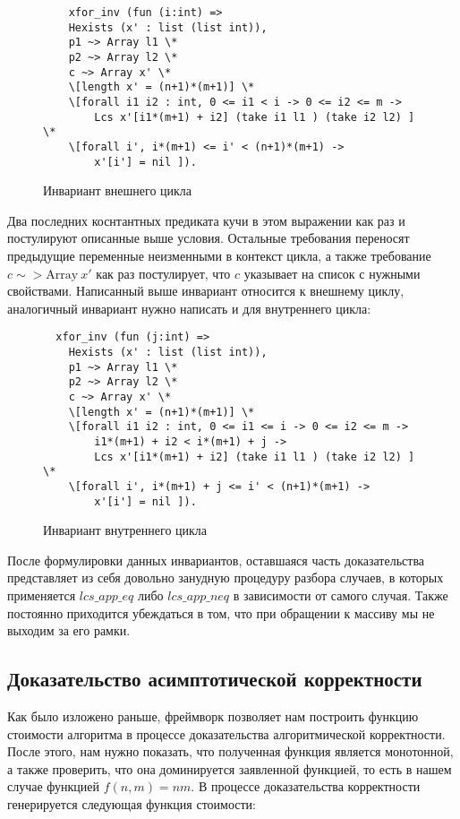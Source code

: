 \begin{figure}[H]
  \caption{Инвариант внешнего цикла}
  \label{code:outer_cycle_inv}
  \begin{verbatim}
    xfor_inv (fun (i:int) => 
    Hexists (x' : list (list int)),
    p1 ~> Array l1 \*
    p2 ~> Array l2 \*
    c ~> Array x' \*
    \[length x' = (n+1)*(m+1)] \*
    \[forall i1 i2 : int, 0 <= i1 < i -> 0 <= i2 <= m -> 
        Lcs x'[i1*(m+1) + i2] (take i1 l1 ) (take i2 l2) ] \* 
    \[forall i', i*(m+1) <= i' < (n+1)*(m+1) ->
        x'[i'] = nil ]). 
  \end{verbatim}
\end{figure}

Два последних коснтантных предиката кучи в этом выражении как раз и постулируют описанные выше условия. Остальные требования переносят
предыдущие переменные неизменными в контекст цикла, а также требование $c \sim> \text{Array}\ x'$  как раз постулирует, что $c$ указывает на
список с нужными свойствами. Написанный выше инвариант относится к внешнему циклу, аналогичный инвариант нужно написать и для внутреннего цикла:

\begin{figure}[H]
  \caption{Инвариант внутреннего цикла}
  \label{code:inner_cycle_inv}
  \begin{verbatim}
  xfor_inv (fun (j:int) => 
    Hexists (x' : list (list int)),
    p1 ~> Array l1 \*
    p2 ~> Array l2 \*
    c ~> Array x' \*
    \[length x' = (n+1)*(m+1)] \*
    \[forall i1 i2 : int, 0 <= i1 <= i -> 0 <= i2 <= m -> 
        i1*(m+1) + i2 < i*(m+1) + j -> 
        Lcs x'[i1*(m+1) + i2] (take i1 l1 ) (take i2 l2) ] \*
    \[forall i', i*(m+1) + j <= i' < (n+1)*(m+1) ->
        x'[i'] = nil ]). 
  \end{verbatim}
\end{figure}

После формулировки данных инвариантов, оставшаяся часть доказательства представляет из себя довольно занудную процедуру
разбора случаев, в которых применяется $lcs\_app\_eq$ либо $lcs\_app\_neq$ в зависимости от самого случая. Также постоянно приходится
убеждаться в том, что при обращении к массиву мы не выходим за его рамки.
\subsection{Доказательство асимптотической корректности}
Как было изложено раньше, фреймворк \cite{base_article} позволяет нам построить функцию стоимости алгоритма в процессе
доказательства алгоритмической корректности. После этого, нам нужно показать, что полученная функция является монотонной, а
также проверить, что она доминируется заявленной функцией, то есть в нашем случае функцией $f(n,m) = nm$. В процессе доказательства
корректности генерируется следующая функция стоимости:

